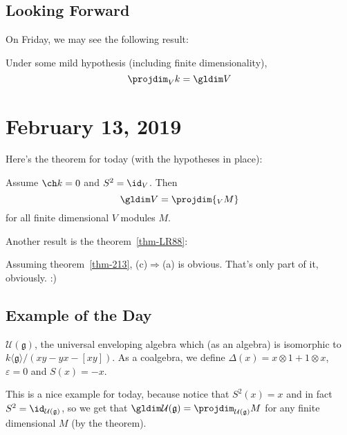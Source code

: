 \documentclass[12pt]{article}
\newcommand*{\g}{\mathfrak{g}}
\begin{document}
\subsection{Looking Forward}
On Friday, we may see the following result:
\begin{thm}
	Under some mild hypothesis (including finite dimensionality),
	\[\projdim_V k=\gldim V\]
\end{thm}

\section{February 13, 2019}
Here's the theorem for today (with the hypotheses in place):
\begin{thm}\label{thm-213}
	Assume $\ch k=0$ and $S^2=\id_V$. Then 
	\[\gldim V=\projdim{_VM}\]
	for all finite dimensional $V$ modules $M$.
\end{thm}
Another result is the theorem~\ref{thm-LR88}:
\begin{prf}
	Assuming theorem~\ref{thm-213}, (c)$\Rightarrow$(a) is obvious. That's only part of it, 
	obviously. :)
\end{prf}
\subsection{Example of the Day}
\begin{ex}
	$\mathcal{U}(\g)$, the universal enveloping algebra which (as an algebra) is isomorphic to
	$k\langle \g\rangle/(xy-yx-[xy])$. As a coalgebra, we define $\Delta(x)=x\otimes 1+1\otimes x$,
	$\varepsilon=0$ and $S(x)=-x$.

	This is a nice example for today, because notice that $S^2(x)=x$ and in fact $S^2=\id_{\mathcal{U}(\g)}$,
	so we get that $\gldim\mathcal{U}(\g)=\projdim_{\mathcal{U}(\g)}M$ for any finite dimensional $M$ (by 
	the theorem).
\end{ex}
\end{document}
